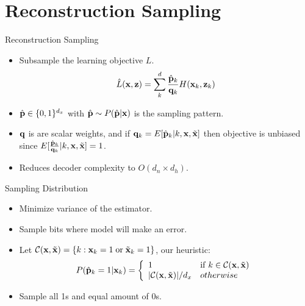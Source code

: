 \documentclass{beamer}
\begin{document}
\section{Reconstruction Sampling}
\begin{frame}{Reconstruction Sampling}
\begin{itemize}
\item Subsample the learning objective $L$.
\[
\hat{L}({\bf x}, {\bf z}) = \sum_k^d \frac{\hat{\bf p}_k}{{\bf q}_k} H({\bf x}_k, {\bf z}_k)
\]
\item $\hat{\bf p} \in \{0, 1\}^{d_x}$ with $\hat{\bf p} \sim
P(\hat{\bf p}|{\bf x})$ is the sampling pattern.
\item ${\bf q}$ is are scalar weights, and if ${\bf q}_k=E[\hat{\bf p}_k|k,{\bf x},\tilde{\bf x}]$ then
objective is unbiased since $E[\frac{\hat{\bf p}_k}{{\bf q}_k}|k,{\bf x},\tilde{\bf x}]=1$.
\item Reduces decoder complexity to $O(d_n\times d_h)$.
\end{itemize}
\end{frame}

\begin{frame}{Sampling Distribution}
\begin{itemize}
\item Minimize variance of the estimator.
\item Sample bits where  model will make an error.
\item Let ${\cal C}({\bf x},\tilde{\bf x})=\{k: {\bf x}_k=1 \;{\rm or}\;\tilde{\bf x}_k=1\}$, our
heuristic:
\begin{equation}
\label{eq:p}
P(\hat{\bf p}_k=1|{\bf x}_k) = \left\{ \begin{array}{ll} 1 & {\rm if}\; k \in {\cal C}({\bf x},\tilde{\bf x}) \nonumber\\
                                              |{\cal C}({\bf x},\tilde{\bf x})|/d_x & otherwise
              \end{array} \right.
\end{equation}
\item Sample all 1s and equal amount of 0s.
\end{itemize}
\end{frame}
\end{document}
